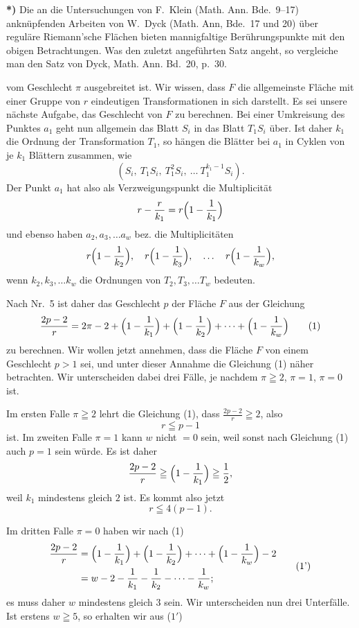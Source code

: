 \documentclass{article}
\begin{document}
\textbf{*)} Die an die Untersuchungen von F.~Klein (Math. Ann. Bde.~9--17) anknüpfenden Arbeiten von W.~Dyck (Math. Ann, Bde.~17 und 20) über reguläre Riemann'sche Flächen bieten mannigfaltige Berührungspunkte mit den obigen Betrachtungen. Was den zuletzt angeführten Satz angeht, so vergleiche man den Satz von Dyck, Math. Ann. Bd.~20, p.~30.

vom Geschlecht $\pi$ ausgebreitet ist. Wir wissen, dass $F$ die allgemeinste Fläche mit einer Gruppe von $r$ eindeutigen Transformationen in sich darstellt. Es sei unsere nächste Aufgabe, das Geschlecht von $F$ zu berechnen. Bei einer Umkreisung des Punktes $a_1$ geht nun allgemein das Blatt $S_i$ in das Blatt $T_1 S_i$ über. Ist daher $k_1$ die Ordnung der Transformation $T_1$, so hängen die Blätter bei $a_1$ in Cyklen von je $k_1$ Blättern zusammen, wie
\[
(S_i, \ T_1 S_i, \ T_1^2 S_i, \ \dots \ T_1^{k_1-1} S_i).
\]
Der Punkt $a_1$ hat also als Verzweigungspunkt die Multiplicität
\[
r - \frac{r}{k_1} = r \Bigl(1 - \frac{1}{k_1}\Bigr)
\]
und ebenso haben $a_2, a_3, \dots a_w$ bez. die Multiplicitäten
\[
r \Bigl(1 - \frac{1}{k_2}\Bigr), \quad r \Bigl(1 - \frac{1}{k_3}\Bigr), \quad \dots \quad r \Bigl(1 - \frac{1}{k_w}\Bigr),
\]
wenn $k_2, k_3, \dots k_w$ die Ordnungen von $T_2, T_3, \dots T_w$ bedeuten.

Nach Nr.~5 ist daher das Geschlecht $p$ der Fläche $F$ aus der Gleichung
\[
\frac{2p-2}{r} = 2\pi - 2 + \Bigl(1 - \frac{1}{k_1}\Bigr) + \Bigl(1 - \frac{1}{k_2}\Bigr) + \dots + \Bigl(1 - \frac{1}{k_w}\Bigr)
\tag{1}
\]
zu berechnen. Wir wollen jetzt annehmen, dass die Fläche $F$ von einem Geschlecht $p > 1$ sei, und unter dieser Annahme die Gleichung (1) näher betrachten. Wir unterscheiden dabei drei Fälle, je nachdem $\pi \geqq 2$, $\pi = 1$, $\pi = 0$ ist.

Im ersten Falle $\pi \geqq 2$ lehrt die Gleichung (1), dass $\frac{2p-2}{r} \geqq 2$, also
\[
r \leqq p - 1
\tag{2}
\]
ist. Im zweiten Falle $\pi = 1$ kann $w$ nicht $= 0$ sein, weil sonst nach Gleichung (1) auch $p = 1$ sein würde. Es ist daher
\[
\frac{2p-2}{r} \geqq \Bigl(1 - \frac{1}{k_1}\Bigr) \geqq \frac{1}{2},
\]
weil $k_1$ mindestens gleich $2$ ist. Es kommt also jetzt
\[
r \leqq 4(p - 1).
\tag{3}
\]

Im dritten Falle $\pi = 0$ haben wir nach (1)
\[
\begin{aligned}
\frac{2p-2}{r} &= \Bigl(1 - \frac{1}{k_1}\Bigr) + \Bigl(1 - \frac{1}{k_2}\Bigr) + \dots + \Bigl(1 - \frac{1}{k_w}\Bigr) - 2 \\
&= w - 2 - \frac{1}{k_1} - \frac{1}{k_2} - \dots - \frac{1}{k_w};
\end{aligned}
\tag{1'}
\]
es muss daher $w$ mindestens gleich $3$ sein. Wir unterscheiden nun drei Unterfälle. Ist erstens $w \geqq 5$, so erhalten wir aus ($1'$)
\end{document}
